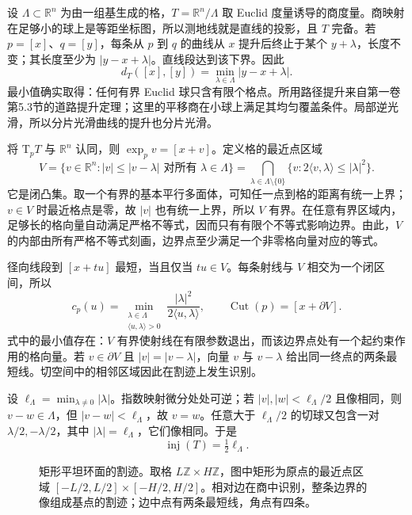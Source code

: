 \begin{example}\label{g3:exm:flat-torus-cut-locus}
	设 \(\Lambda\subset\mathbb R^n\) 为由一组基生成的格，\(T=\mathbb R^n/\Lambda\) 取 Euclid 度量诱导的商度量。商映射在足够小的球上是等距坐标图，所以测地线就是直线的投影，且 \(T\) 完备。若 \(p=[x]\)、\(q=[y]\)，每条从 \(p\) 到 \(q\) 的曲线从 \(x\) 提升后终止于某个 \(y+\lambda\)，长度不变；其长度至少为 \(|y-x+\lambda|\)。直线段达到该下界。因此
	\begin{equation}\label{g3:eq:flat-torus-distance}
		d_T([x],[y])=\min_{\lambda\in\Lambda}|y-x+\lambda|.
	\end{equation}
	最小值确实取得：任何有界 Euclid 球只含有限个格点。所用路径提升来自第一卷第5.3节的道路提升定理；这里的平移商在小球上满足其均匀覆盖条件。局部逆光滑，所以分片光滑曲线的提升也分片光滑。

	将 \(\mathrm{T}_pT\) 与 \(\mathbb R^n\) 认同，则 \(\exp_pv=[x+v]\)。定义格的最近点区域
	\[
		V=\{v\in\mathbb R^n:|v|\le|v-\lambda|\text{ 对所有 }\lambda\in\Lambda\}
		=\bigcap_{\lambda\in\Lambda\setminus\{0\}}
		\{v:2\langle v,\lambda\rangle\le|\lambda|^2\}.
	\]
	它是闭凸集。取一个有界的基本平行多面体，可知任一点到格的距离有统一上界；\(v\in V\) 时最近格点是零，故 \(|v|\) 也有统一上界，所以 \(V\) 有界。在任意有界区域内，足够长的格向量自动满足严格不等式，因而只有有限个不等式影响边界。由此，\(V\) 的内部由所有严格不等式刻画，边界点至少满足一个非零格向量对应的等式。

	径向线段到 \([x+tu]\) 最短，当且仅当 \(tu\in V\)。每条射线与 \(V\) 相交为一个闭区间，所以
	\[
		c_p(u)=\min_{\substack{\lambda\in\Lambda\\\langle u,\lambda\rangle>0}}
		\frac{|\lambda|^2}{2\langle u,\lambda\rangle},\qquad
		\operatorname{Cut}(p)=[x+\partial V].
	\]
	式中的最小值存在：\(V\) 有界使射线在有限参数退出，而该边界点处有一个起约束作用的格向量。若 \(v\in\partial V\) 且 \(|v|=|v-\lambda|\)，向量 \(v\) 与 \(v-\lambda\) 给出同一终点的两条最短线。切空间中的相邻区域因此在割迹上发生识别。

	设 \(\ell_\Lambda=\min_{\lambda\ne0}|\lambda|\)。指数映射微分处处可逆；若 \(|v|,|w|<\ell_\Lambda/2\) 且像相同，则 \(v-w\in\Lambda\)，但 \(|v-w|<\ell_\Lambda\)，故 \(v=w\)。任意大于 \(\ell_\Lambda/2\) 的切球又包含一对 \(\lambda/2,-\lambda/2\)，其中 \(|\lambda|=\ell_\Lambda\)，它们像相同。于是
	\[
		\operatorname{inj}(T)=\tfrac12\ell_\Lambda.
	\]
\end{example}

\begin{figure}[htbp]
	\centering
	
	\caption[矩形平坦环面的割迹]{矩形平坦环面的割迹。取格 \(L\mathbb Z\times H\mathbb Z\)，图中矩形为原点的最近点区域 \([-L/2,L/2]\times[-H/2,H/2]\)。相对边在商中识别，整条边界的像组成基点的割迹；边中点有两条最短线，角点有四条。}
	\label{g3:fig:torus-cut-locus}
\end{figure}

